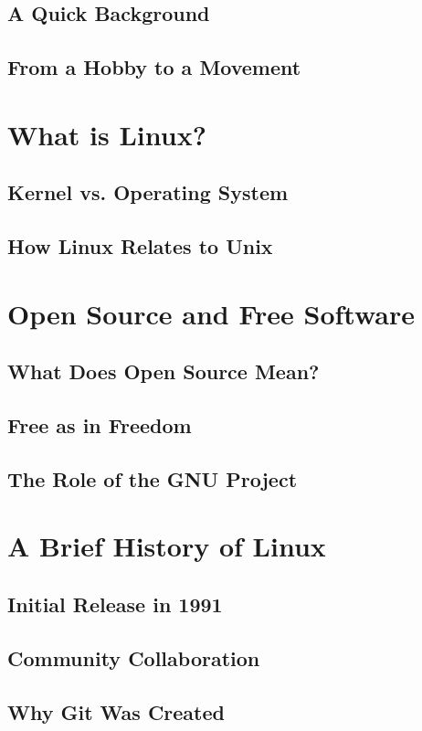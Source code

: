 	\subsection{A Quick Background}
	\subsection{From a Hobby to a Movement}
	
	\section{What is Linux?}
	\subsection{Kernel vs. Operating System}
	\subsection{How Linux Relates to Unix}
	
	\section{Open Source and Free Software}
	\subsection{What Does Open Source Mean?}
	\subsection{Free as in Freedom}
	\subsection{The Role of the GNU Project}
	
	\section{A Brief History of Linux}
	\subsection{Initial Release in 1991}
	\subsection{Community Collaboration}
	\subsection{Why Git Was Created}
	
